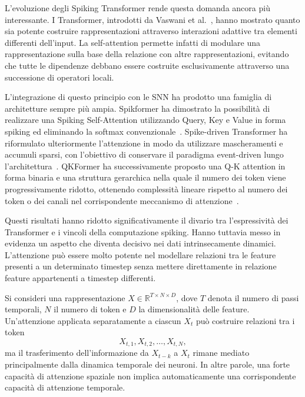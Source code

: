 L'evoluzione degli Spiking Transformer rende questa domanda ancora più interessante. I Transformer, introdotti da Vaswani et al.~\cite{vaswani2017attention}, hanno mostrato quanto sia potente costruire rappresentazioni attraverso interazioni adattive tra elementi differenti dell'input. La self-attention permette infatti di modulare una rappresentazione sulla base della relazione con altre rappresentazioni, evitando che tutte le dipendenze debbano essere costruite esclusivamente attraverso una successione di operatori locali.

L'integrazione di questo principio con le SNN ha prodotto una famiglia di architetture sempre più ampia. Spikformer ha dimostrato la possibilità di realizzare una Spiking Self-Attention utilizzando Query, Key e Value in forma spiking ed eliminando la softmax convenzionale~\cite{zhou2023spikformer}. Spike-driven Transformer ha riformulato ulteriormente l'attenzione in modo da utilizzare mascheramenti e accumuli sparsi, con l'obiettivo di conservare il paradigma event-driven lungo l'architettura~\cite{yao2023spikedriven}. QKFormer ha successivamente proposto una Q-K attention in forma binaria e una struttura gerarchica nella quale il numero dei token viene progressivamente ridotto, ottenendo complessità lineare rispetto al numero dei token o dei canali nel corrispondente meccanismo di attenzione~\cite{zhou2024qkformer}.

Questi risultati hanno ridotto significativamente il divario tra l'espressività dei Transformer e i vincoli della computazione spiking. Hanno tuttavia messo in evidenza un aspetto che diventa decisivo nei dati intrinsecamente dinamici. L'attenzione può essere molto potente nel modellare relazioni tra le feature presenti a un determinato timestep senza mettere direttamente in relazione feature appartenenti a timestep differenti.

Si consideri una rappresentazione $X \in \mathbb{R}^{T \times N \times D}$, dove $T$ denota il numero di passi temporali, $N$ il numero di token e $D$ la dimensionalità delle feature. Un'attenzione applicata separatamente a ciascun $X_t$ può costruire relazioni tra i token
\begin{equation*}
X_{t,1}, X_{t,2}, \dots, X_{t,N},
\end{equation*}
ma il trasferimento dell'informazione da $X_{t-k}$ a $X_t$ rimane mediato principalmente dalla dinamica temporale dei neuroni. In altre parole, una forte capacità di attenzione spaziale non implica automaticamente una corrispondente capacità di attenzione temporale.

